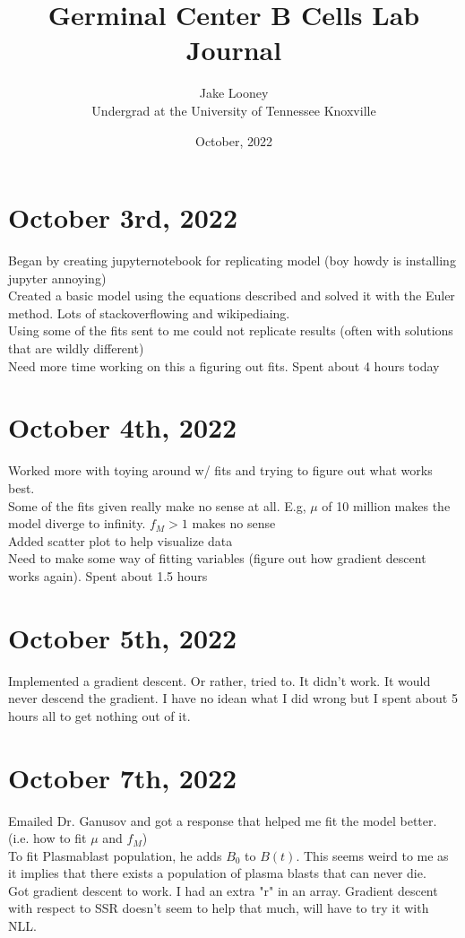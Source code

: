 \documentclass[letterpaper,12pt]{article}
\begin{document}
\title{Germinal Center B Cells Lab Journal}
\author{Jake Looney\\ Undergrad at the University of Tennessee Knoxville}
\date{October, 2022}
\maketitle

\tableofcontents
\newpage
{}

\section{October 3rd, 2022}
  Began by creating jupyternotebook for replicating model (boy howdy is installing jupyter annoying)
\\
  Created a basic model using the equations described and solved it with the Euler method. Lots of stackoverflowing and wikipediaing.
\\
  Using some of the fits sent to me could not replicate results (often with solutions that are wildly different)
\\
  Need more time working on this a figuring out fits. Spent about 4 hours today

\section{October 4th, 2022}
  Worked more with toying around w/ fits and trying to figure out what works best. 
\\
  Some of the fits given really make no sense at all. E.g, $\mu$ of 10 million makes the model diverge to infinity. $f_M > 1$ makes no sense
\\
  Added scatter plot to help visualize data
\\
  Need to make some way of fitting variables (figure out how gradient descent works again). Spent about 1.5 hours

\section{October 5th, 2022}
  Implemented a gradient descent. Or rather, tried to. It didn't work. It would never descend the gradient. 
I have no idean what I did wrong but I spent about 5 hours all to get nothing out of it.

\section{October 7th, 2022}
  Emailed Dr. Ganusov and got a response that helped me fit the model better. (i.e. how to fit $\mu$ and $f_M$)
\\
  To fit Plasmablast population, he adds $B_0$ to $B(t)$. This seems weird to me as it implies that there exists a population of plasma blasts that can never die.
\\
  Got gradient descent to work. I had an extra "r" in an array. Gradient descent with respect to SSR doesn't seem to help that much, will have to try it with NLL.
\end{document}
